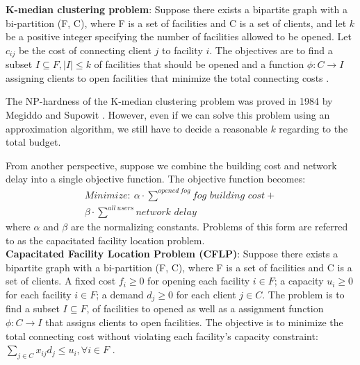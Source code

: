 \documentclass[10pt,journal,compsoc]{IEEEtran}
\begin{document}
\textbf{K-median clustering problem}: Suppose there exists a bipartite graph with a bi-partition (F, C), where F is a set of facilities and C is a set of clients, and let $k$ be a positive integer specifying the number of facilities allowed to be opened. Let $c_{ij}$ be the cost of connecting client $j$ to facility $i$. The objectives are to find a subset $I \subseteq F, |I| \leq k$ of facilities that should be opened and a function $\phi: C \to I$ assigning clients to open facilities that minimize the total connecting costs \cite{Vazirani:2001:AA:500776}.

The NP-hardness of the K-median clustering problem was proved in 1984 by Megiddo and Supowit \cite{1984}. 
However, even if we can solve this problem using an approximation algorithm, we still have to decide a reasonable $k$ regarding to the total budget. %

From another perspective, suppose we combine the building cost and network delay into a single objective function. The objective function becomes:
\begin{align}
\textit{Minimize}: \ \alpha\cdot\overset{opened\ fog}{\sum} \textit{fog building cost} + \\
\beta \cdot \overset{all\ users}{\sum}\textit{network delay}
\end{align}
where $\alpha$ and $\beta$ are the normalizing constants.
Problems of this form are referred to as the capacitated facility location problem.\\


\textbf{Capacitated Facility Location 
Problem (CFLP)}: Suppose there exists a bipartite graph with a bi-partition (F, C), where F is a set of facilities and C is a set of clients. A fixed cost $f_i \geq 0 $ for opening each facility $i \in F$; a capacity $u_i \geq 0 $ for each facility $i \in F$; a demand $d_j \geq 0$ for each client $j \in C$. The problem is to find a subset $I \subseteq F$, of facilities to opened as well as a assignment function $\phi: C \to I $ that assigns clients to open facilities. The objective is to minimize the total connecting cost without violating each facility's capacity constraint: $\sum_{j \in C} x_{ij} d_j \leq u_i,  \forall i \in F$ \cite{Vazirani:2001:AA:500776}. 
\end{document}
